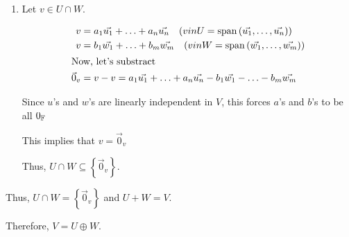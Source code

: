 {\begin{enumerate}[label=(\roman*)]
		      \[
			      v = \underbrace{a_1 \vec{u_1} + \ldots + a_{n} \vec{u_n}}_{\in U, a_{i} \in \FF} + \underbrace{b_1 \vec{w_1} + \ldots + b_{m} \vec{w_m}}_{\in W, b_{i} \in \FF} = U + W
		      \]
		      As such, \(V = U + W\)
		\item Let \(v \in  U \cap W\).

		      \begin{align*}
			      v           & = a_1 \vec{u_1} + \ldots + a_{n} \vec{u_n} \quad (v in U = \operatorname{span}\left( \vec{u_1}, \ldots, \vec{u_n}  \right) ) \\
			      v           & = b_1 \vec{w_1} + \ldots + b_{m} \vec{w_m} \quad (v in W = \operatorname{span}\left( \vec{w_1}, \ldots, \vec{w_m}  \right) ) \\
			      \intertext{Now, let's substract}
			      \vec{0}_{v} & = v - v = a_1 \vec{u_{1}} + \ldots + a_{n} \vec{u_n} - b_1 \vec{w_1} - \ldots - b_{m} \vec{w_m}                              \\
		      \end{align*}

		      Since \(u\)'s and \(w\)'s are linearly independent in \(V\), this forces \(a\)'s and \(b\)'s to be all \(0_{\FF}\)

		      This implies that \(v = \vec{0}_{v} \)

		      Thus, \(U \cap W \subseteq \left\{ \vec{0}_{v}  \right\} \).

	\end{enumerate}

	Thus, \(U \cap W = \left\{ \vec{0}_{v}  \right\} \) and \(U + W = V\).

	Therefore, \(V = U \oplus W\).

	}
